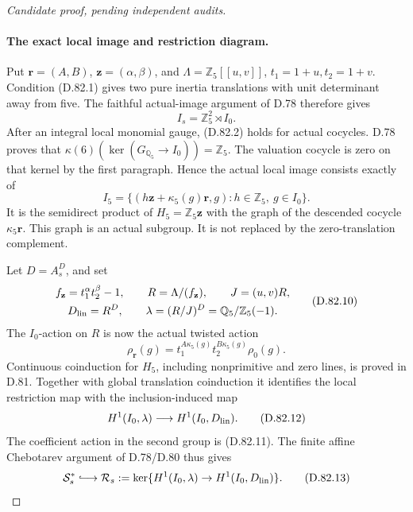 \begin{proof}[Candidate proof, pending independent audits]
\paragraph{The exact local image and restriction diagram.}
Put \(\mathbf r=(A,B)\), \(\mathbf z=(\alpha,\beta)\), and
\(\Lambda=\mathbb Z_5[[u,v]]\), \(t_1=1+u,t_2=1+v\).
Condition (D.82.1) gives two pure inertia translations with
unit determinant away from five. The faithful actual-image
argument of D.78 therefore gives
\[
                          I_s=\mathbb Z_5^2\rtimes I_0.
                                                               \tag{D.82.8}
\]
After an integral local monomial gauge, (D.82.2) holds for
actual cocycles. D.78 proves that
\(\kappa(6)(\ker(G_{\mathbb Q_5}\to I_0))=\mathbb Z_5\).
The valuation cocycle is zero on that kernel by the first
paragraph. Hence the actual local image consists exactly of
\[
 I_5=\{(h\mathbf z+\kappa_5(g)\mathbf r,g):
                              h\in\mathbb Z_5,\ g\in I_0\}.
                                                               \tag{D.82.9}
\]
It is the semidirect product of \(H_5=\mathbb Z_5\mathbf z\)
with the graph of the descended cocycle
\(\kappa_5\mathbf r\). This graph is an actual subgroup.
It is not replaced by the zero-translation complement.

Let \(D=A_s^D\), and set
\[
 \begin{gathered}
 f_{\mathbf z}=t_1^\alpha t_2^\beta-1,\qquad
 R=\Lambda/(f_{\mathbf z}),\qquad J=(u,v)R,\\
 D_{\rm lin}=R^D,\qquad
 \lambda=(R/J)^D=\mathbb Q_5/\mathbb Z_5(-1).
 \end{gathered}                                               \tag{D.82.10}
\]
The \(I_0\)-action on \(R\) is now the actual twisted action
\[
 \rho_{\mathbf r}(g)
        =t_1^{A\kappa_5(g)}t_2^{B\kappa_5(g)}\rho_0(g).
                                                               \tag{D.82.11}
\]
Continuous coinduction for \(H_5\), including nonprimitive
and zero lines, is proved in D.81. Together with global
translation coinduction it identifies the local restriction
map with the inclusion-induced map
\[
 H^1(I_0,\lambda)\longrightarrow
             H^1(I_0,D_{\rm lin}) .
                                                               \tag{D.82.12}
\]
The coefficient action in the second group is (D.82.11).
The finite affine Chebotarev argument of D.78/D.80 thus gives
\[
 \mathcal S_s^*\lhook\joinrel\longrightarrow
 \mathcal R_s:=
 \ker\{H^1(I_0,\lambda)\to H^1(I_0,D_{\rm lin})\}.
                                                               \tag{D.82.13}
\]


\end{proof}
